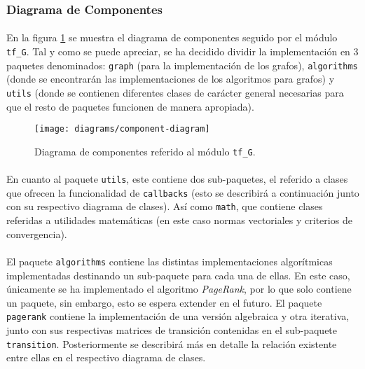 \documentclass{subfiles}
\begin{document}
        \subsubsection{Diagrama de Componentes}
        \label{sec:component_diagram}

          \paragraph{}
          En la figura \ref{img:component_diagram} se muestra el diagrama de componentes seguido por el módulo \texttt{tf\_G}. Tal y como se puede apreciar, se ha decidido dividir la implementación en 3 paquetes denominados: \texttt{graph} (para la implementación de los grafos), \texttt{algorithms} (donde se encontrarán las implementaciones de los algoritmos para grafos) y \texttt{utils} (donde se contienen diferentes clases de carácter general necesarias para que el resto de paquetes funcionen de manera apropiada).

          \begin{figure}[h!]
            \centering
            \texttt{[image: diagrams/component-diagram]}
            \caption{Diagrama de componentes referido al módulo \texttt{tf\_G}.}
            \label{img:component_diagram}
          \end{figure}

          \paragraph{}
          En cuanto al paquete \texttt{utils}, este contiene dos sub-paquetes, el referido a clases que ofrecen la funcionalidad de \texttt{callbacks} (esto se describirá a continuación junto con su respectivo diagrama de clases). Así como \texttt{math}, que contiene clases referidas a utilidades matemáticas (en este caso normas vectoriales y criterios de convergencia).

          \paragraph{}
          El paquete \texttt{algorithms} contiene las distintas implementaciones algorítmicas implementadas destinando un sub-paquete para cada una de ellas. En este caso, únicamente se ha implementado el algoritmo \emph{PageRank}, por lo que solo contiene un paquete, sin embargo, esto se espera extender en el futuro. El paquete \texttt{pagerank} contiene la implementación de una versión algebraica y otra iterativa, junto con sus respectivas matrices de transición contenidas en el sub-paquete \texttt{transition}. Posteriormente se describirá más en detalle la relación existente entre ellas en el respectivo diagrama de clases.
\end{document}
